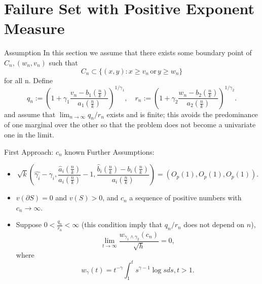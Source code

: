 \documentclass[11pt]{beamer}
\begin{document}
\section{Failure Set with Positive Exponent Measure}
\begin{frame}{Assumption}
In this section we assume that there exists some boundary point of $C_n, (w_n,v_n)$ such that
\begin{displaymath}
C_n \subset \{(x,y):x\ge v_n\, \text{or}\,y\ge w_n \}
\end{displaymath}
for all n. Define
\begin{displaymath}
q_n:=(1+\gamma_1 \frac{v_n-b_1(\frac{n}{k})}{a_1(\frac{n}{k})})^{1/\gamma_1},\quad r_n:=(1+\gamma_2 \frac{w_n-b_2(\frac{n}{k})}{a_2(\frac{n}{k})})^{1/\gamma_2}.
\end{displaymath}
and assume that $\lim_{n\to \infty} q_n/r_n$ exists and is finite; this avoids the predominance of
one marginal over the other so that the problem does not become a univariate one in
the limit.
\end{frame}



\begin{frame}{First Approach: $c_n$ known}
Further Assumptions:
\begin{itemize}
\item 
\begin{displaymath}
\sqrt{k}(\hat{\gamma_i}-\gamma_i, \frac{\hat{a}_i(\frac{n}{k})}{a_i(\frac{n}{k})}-1, \dfrac{\hat{b}_i(\frac{n}{k})-b_i(\frac{n}{k})}{a_i(\frac{n}{k})})=(O_p(1),O_p(1),O_p(1)).
\end{displaymath}
\item $v(\partial S)=0$ and $v(S)>0$, and $c_n$ a sequence of positive numbers with $c_n\to \infty$.
\item Suppose $0<\frac{q_n}{r_n}<\infty$ (this condition imply that $q_n/r_n$ does not depend on $n$),
\begin{equation}\tag{8.2.5}
\lim_{t\to \infty} \frac{w_{\gamma_1 \land \gamma_2}(c_n)}{\sqrt{h}}=0,
\end{equation}
where
\begin{displaymath}
w_{\gamma}(t)=t^{-\gamma}\int_{1}^t s^{\gamma-1}\log s ds, t>1.
\end{displaymath}
\end{itemize}
\end{frame}
\end{document}
